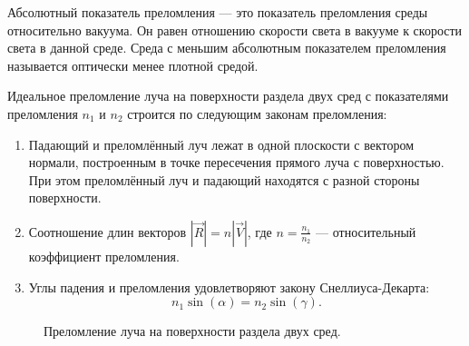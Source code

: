 \documentclass[14pt,a4paper]{extarticle}
\begin{document}
			Абсолютный показатель преломления --- это показатель преломления среды относительно вакуума.
			Он равен отношению скорости света в вакууме к скорости света в данной среде.
			Среда с меньшим абсолютным показателем преломления называется оптически менее плотной средой.
			
			
			Идеальное преломление луча на поверхности раздела двух сред с показателями преломления $n_1$ и $n_2$  строится по следующим законам преломления:
			\begin{enumerate}
				\item Падающий и преломлённый луч лежат в одной плоскости с вектором нормали,
				построенным в точке пересечения прямого луча с поверхностью. 
				При этом преломлённый луч и падающий находятся с разной стороны поверхности.
				\item Соотношение длин векторов $|\vec{R}|=n|\vec{V}|$, где $n = \frac{n_1}{n_2}$ --- 
				относительный коэффициент преломления.
				\item Углы падения и преломления удовлетворяют закону Снеллиуса-Декарта:
				\begin{equation*}
					n_1\sin(\alpha) = n_2\sin(\gamma).
				\end{equation*} 
			\end{enumerate}
			
			\begin{figure}[H]%
				\label{Preloml}
				\noindent{}
				\caption{Преломление луча на поверхности раздела двух сред.}
				
			\end{figure}
			
\end{document}
